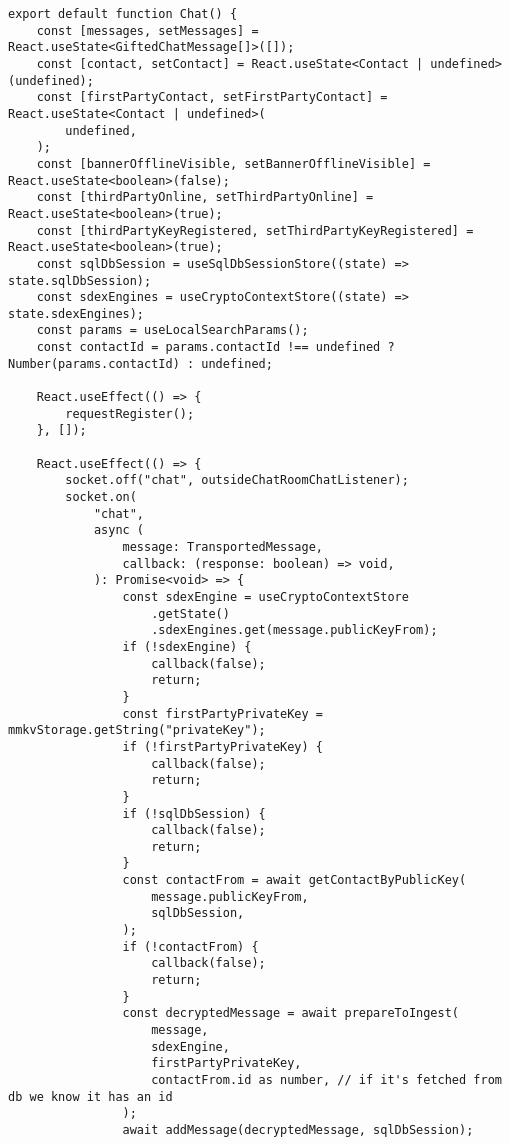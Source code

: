 \documentclass[../main.tex]{subfiles}
\begin{document}
\begin{lstlisting}[caption={Implementacja ekranu czatu},label={lst:js_chat_screen}]
export default function Chat() {
    const [messages, setMessages] = React.useState<GiftedChatMessage[]>([]);
    const [contact, setContact] = React.useState<Contact | undefined>(undefined);
    const [firstPartyContact, setFirstPartyContact] = React.useState<Contact | undefined>(
        undefined,
    );
    const [bannerOfflineVisible, setBannerOfflineVisible] = React.useState<boolean>(false);
    const [thirdPartyOnline, setThirdPartyOnline] = React.useState<boolean>(true);
    const [thirdPartyKeyRegistered, setThirdPartyKeyRegistered] = React.useState<boolean>(true);
    const sqlDbSession = useSqlDbSessionStore((state) => state.sqlDbSession);
    const sdexEngines = useCryptoContextStore((state) => state.sdexEngines);
    const params = useLocalSearchParams();
    const contactId = params.contactId !== undefined ? Number(params.contactId) : undefined;

    React.useEffect(() => {
        requestRegister();
    }, []);
    
    React.useEffect(() => {
        socket.off("chat", outsideChatRoomChatListener);
        socket.on(
            "chat",
            async (
                message: TransportedMessage,
                callback: (response: boolean) => void,
            ): Promise<void> => {
                const sdexEngine = useCryptoContextStore
                    .getState()
                    .sdexEngines.get(message.publicKeyFrom);
                if (!sdexEngine) {
                    callback(false);
                    return;
                }
                const firstPartyPrivateKey = mmkvStorage.getString("privateKey");
                if (!firstPartyPrivateKey) {
                    callback(false);
                    return;
                }
                if (!sqlDbSession) {
                    callback(false);
                    return;
                }
                const contactFrom = await getContactByPublicKey(
                    message.publicKeyFrom,
                    sqlDbSession,
                );
                if (!contactFrom) {
                    callback(false);
                    return;
                }
                const decryptedMessage = await prepareToIngest(
                    message,
                    sdexEngine,
                    firstPartyPrivateKey,
                    contactFrom.id as number, // if it's fetched from db we know it has an id
                );
                await addMessage(decryptedMessage, sqlDbSession);


\end{lstlisting}
\end{document}
